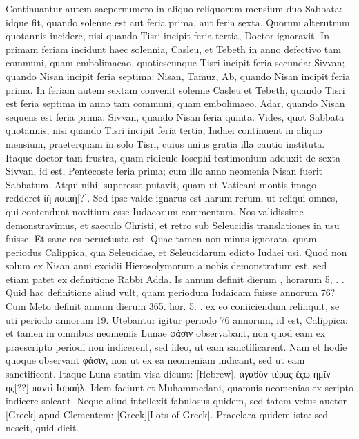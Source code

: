 Continuantur autem saepernumero in aliquo reliquorum mensium
duo Sabbata: idque fit, quando solenne est aut feria prima, aut feria
sexta.
Quorum alterutrum quotannis incidere, nisi quando Tisri
incipit feria tertia, Doctor ignoravit.
In primam feriam incidunt
haec solennia,  Casleu, et  Tebeth in anno defectivo tam
communi, quam embolimaeao, quotiescunque Tisri incipit feria secunda:
 Sivvan; quando Nisan incipit feria septima:
 Nisan,  Tamuz,
 Ab, quando Nisan incipit feria prima.
In feriam autem sextam
convenit solenne  Casleu et
  Tebeth, quando Tisri est feria
septima in anno tam communi, quam embolimaeo.
 Adar, quando
Nisan sequens est feria prima:  Sivvan, quando Nisan feria quinta.
Vides, quot Sabbata quotannis, nisi quando Tisri incipit
 feria tertia, Iudaei
continuent in aliquo mensium, praeterquam in solo Tisri, cuius
unius gratia illa cautio instituta.
Itaque doctor tam frustra, quam ridicule
Iosephi testimonium adduxit de sexta Sivvan, id est, Pentecoste
feria prima; cum illo anno neomenia Nisan fuerit Sabbatum.
Atqui
nihil superesse putavit, quam ut Vaticani montis imago redderet
\textgreek{ἰὴ παιαή[?]}.
Sed ipse valde ignarus est harum rerum, ut reliqui omnes,
qui contendunt novitium esse Iudaeorum commentum.
Nos
validissime demonstravimus, et saeculo Christi, et retro sub Seleucidis
translationes in usu fuisse.
Et sane res peruetusta est.
Quae tamen
non minus ignorata, quam periodus Calippica, qua Seleucidae, et
Seleucidarum edicto Iudaei usi.
Quod non solum ex Nisan anni excidii
Hierosolymorum a nobis demonstratum est, sed etiam patet
ex definitione Rabbi Adda.
Is annum definit dierum ,
horarum 5, . .
Quid hac definitione aliud vult, quam periodum
Iudaicam fuisse annorum 76?
Cum Meto definit annum dierum
365. hor. 5. . ex eo coniiciendum relinquit,
 se uti periodo annorum
19.
Utebantur igitur periodo 76 annorum, id est, Calippica:
et tamen in omnibus neomeniis Lunae \textgreek{φάσιν} observabant, non
quod eam ex praescripto periodi non indicerent, sed ideo, ut eam
sanctificarent.
Nam et hodie quoque observant \textgreek{φάσιν}, non ut ex ea
neomeniam indicant, sed ut eam sanctificent.
Itaque Luna statim
visa dicunt: \texthebrew{[Hebrew]}.
\textgreek{ἀγαθὸν τέρας ἔςω ἡμῖν ης[??] παντὶ Ισραήλ.}
Idem faciunt et Muhammedani, quamuis neomenias ex
scripto indicere soleant.
Neque aliud intellexit fabulosus quidem,
sed tatem vetus auctor \textgreek{[Greek]} apud Clementem:
\textgreek{[Greek][Lots of Greek]}.
Praeclara quidem ista: sed nescit, quid dicit.

